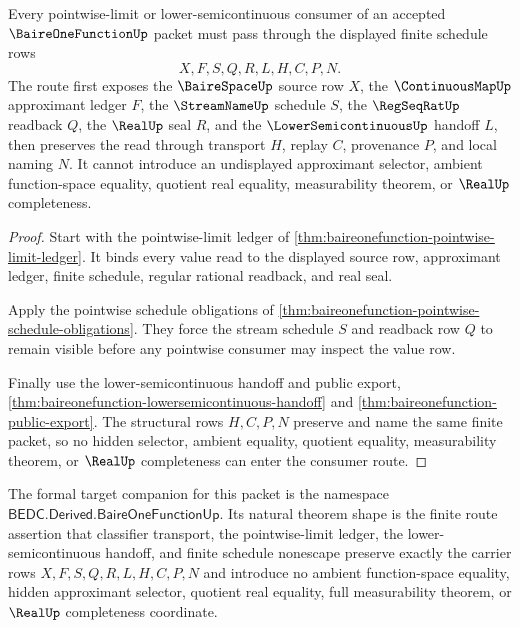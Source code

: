 \begin{theorem}
\label{thm:baireonefunction-finite-schedule-nonescape}
Every pointwise-limit or lower-semicontinuous consumer of an accepted $\BaireOneFunctionUp$ packet must pass through the displayed finite schedule rows
$$
X,F,S,Q,R,L,H,C,P,N .
$$
The route first exposes the $\BaireSpaceUp$ source row $X$, the $\ContinuousMapUp$ approximant ledger $F$, the $\StreamNameUp$ schedule $S$, the $\RegSeqRatUp$ readback $Q$, the $\RealUp$ seal $R$, and the $\LowerSemicontinuousUp$ handoff $L$, then preserves the read through transport $H$, replay $C$, provenance $P$, and local naming $N$. It cannot introduce an undisplayed approximant selector, ambient function-space equality, quotient real equality, measurability theorem, or $\RealUp$ completeness.
\end{theorem}
\begin{proof}
Start with the pointwise-limit ledger of \autoref{thm:baireonefunction-pointwise-limit-ledger}. It binds every value read to the displayed source row, approximant ledger, finite schedule, regular rational readback, and real seal.

Apply the pointwise schedule obligations of \autoref{thm:baireonefunction-pointwise-schedule-obligations}. They force the stream schedule $S$ and readback row $Q$ to remain visible before any pointwise consumer may inspect the value row.

Finally use the lower-semicontinuous handoff and public export, \autoref{thm:baireonefunction-lowersemicontinuous-handoff} and \autoref{thm:baireonefunction-public-export}. The structural rows $H,C,P,N$ preserve and name the same finite packet, so no hidden selector, ambient equality, quotient equality, measurability theorem, or $\RealUp$ completeness can enter the consumer route.
\end{proof}


The formal target companion for this packet is the namespace $\mathsf{BEDC.Derived.BaireOneFunctionUp}$. Its natural theorem shape is the finite route assertion that classifier transport, the pointwise-limit ledger, the lower-semicontinuous handoff, and finite schedule nonescape preserve exactly the carrier rows $X,F,S,Q,R,L,H,C,P,N$ and introduce no ambient function-space equality, hidden approximant selector, quotient real equality, full measurability theorem, or $\RealUp$ completeness coordinate.


